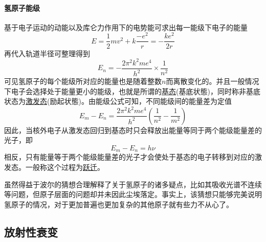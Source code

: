 \paragraph{氢原子能级} 基于电子运动的动能以及库仑力作用下的电势能可求出每一能级下电子的能量
\begin{equation*}
    E=\frac12mv^2+k\frac{-e^2}{r}=-\frac{ke^2}{2r}
\end{equation*}
再代入轨道半径可整理得到
\begin{equation*}
    E_n=-\frac{2\pi^2k^2me^4}{h^2}\times\frac{1}{n^2}
\end{equation*}
可见氢原子的每个能级所对应的能量也是随着整数$n$而离散变化的。并且一般情况下电子会选择处于能量更小的能级，也就是所谓的\underline{基态}(基底状態)，同时称非基底状态为\underline{激发态}(励起状態)。由能级公式可知，不同能级间的能量差为定值
\begin{equation*}
    E_m-E_n=\frac{2\pi^2k^2me^4}{h^2}\left(\frac{1}{n^2}-\frac{1}{m^2}\right)
\end{equation*}
因此，当核外电子从激发态回归到基态时只会释放出能量等同于两个能级能量差的光子，即
\begin{equation*}
    E_m-E_n=h\nu
\end{equation*}
相反，只有能量等于两个能级能量差的光子才会使处于基态的电子转移到对应的激发态。一般称这个过程为\underline{跃迁}。

虽然得益于波尔的猜想合理解释了关于氢原子的诸多疑点，比如其吸收光谱不连续等问题，但原子层面的问题却并未因此尘埃落定。事实上，该猜想只能够完美说明氢原子的情况，对于更加普遍也更加复杂的其他原子就有些力不从心了。

\subsection{放射性衰变}

